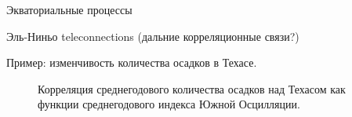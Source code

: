 \begin{chapter}{Экваториальные процессы}
\begin{section}{Эль-Ниньо teleconnections (дальние корреляционные связи?)}
\begin{paragraph}{Пример: изменчивость количества осадков в Техасе.}
\begin{figure}[t!]
\begin{centering}
\end{centering}
\caption{Корреляция среднегодового количества осадков над Техасом 
как функции среднегодового индекса Южной Осцилляции.~\cite{Stewart:1995}}
\label{fig:texasrain}
\end{figure}
%
%
\end{paragraph}
\end{section}


\end{chapter}
